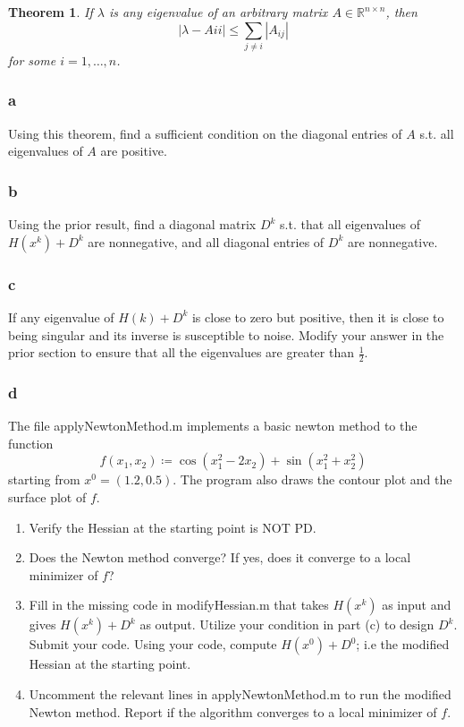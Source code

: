 \documentclass[11pt]{report}
\newtheorem{theorem}{Theorem}[chapter]
\theoremstyle{definition}
\begin{document}
\begin{theorem}
	If $\lambda$ is any eigenvalue of an arbitrary matrix $A\in\mathbb{R}^{n\times n}$, then
	\[|\lambda-A{ii}|\leq\sum_{j\neq i}|A_{ij}|\]
	for some $i=1,\ldots,n$.
\end{theorem}
\subsubsection*{a}
Using this theorem, find a sufficient condition on the diagonal entries of $A$
s.t. all eigenvalues of $A$ are positive.
\subsubsection*{b}
Using the prior result, find a diagonal matrix $D^k$ s.t. that all eigenvalues of $H(x^k)+D^k$
are nonnegative, and all diagonal entries of $D^k$ are nonnegative.
\subsubsection*{c}
If any eigenvalue of $H(k)+D^k$ is close to zero but positive, then it is close
to being singular and its inverse is susceptible to noise. Modify your answer in the prior section to
ensure that all the eigenvalues are greater than $\frac{1}{2}$.
\subsubsection*{d}
The file applyNewtonMethod.m implements a basic newton method to the function
\[f(x_1, x_2)\coloneqq \cos(x_1^2-2x_2)+\sin(x_1^2+x_2^2)\]
starting from $x^0=(1.2,0.5)$. The program also draws the contour plot and the surface plot of $f$.
\begin{enumerate}
	\item Verify the Hessian at the starting point is NOT PD.
	\item Does the Newton method converge? If yes, does it converge to a local
	      minimizer of $f$?
	\item Fill in the missing code in modifyHessian.m that takes $H(x^k)$ as
	      input and gives $H(x^k)+D^k$ as output. Utilize your condition in part
	      (c) to design $D^k$. Submit your code. Using your code, compute
	      $H(x^0)+D^0$; i.e the modified Hessian at the starting point.
	\item Uncomment the relevant lines in applyNewtonMethod.m to run the
	      modified Newton method. Report if the algorithm converges to a local
	      minimizer of $f$.
\end{enumerate}
\end{document}
